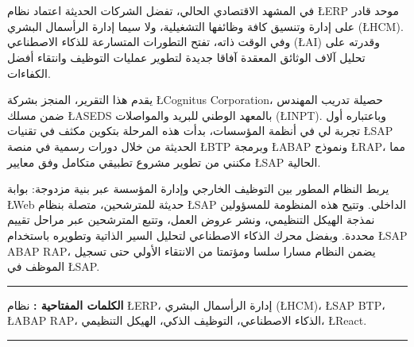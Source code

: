 \chapter*{}

\begin{RLtext}
\noindent
في المشهد الاقتصادي الحالي، تفضل الشركات الحديثة اعتماد نظام \L{ERP} موحد قادر على إدارة وتنسيق كافة وظائفها التشغيلية، ولا سيما إدارة الرأسمال البشري (\L{HCM}). وفي الوقت ذاته، تفتح التطورات المتسارعة للذكاء الاصطناعي (\L{AI}) وقدرته على تحليل آلاف الوثائق المعقدة آفاقا جديدة لتطوير عمليات التوظيف وانتقاء أفضل الكفاءات.

\vspace{0.3cm}
يقدم هذا التقرير، المنجز بشركة \L{Cognitus Corporation}، حصيلة تدريب المهندس ضمن مسلك \L{ASEDS} بالمعهد الوطني للبريد والمواصلات (\L{INPT}). وباعتباره أول تجربة لي في أنظمة المؤسسات، بدأت هذه المرحلة بتكوين مكثف في تقنيات \L{SAP} الحديثة من خلال دورات رسمية في منصة \L{BTP} وبرمجة \L{ABAP} ونموذج \L{RAP}، مما مكنني من تطوير مشروع تطبيقي متكامل وفق معايير \L{SAP} الحالية.

\vspace{0.3cm}
يربط النظام المطور بين التوظيف الخارجي وإدارة المؤسسة عبر بنية مزدوجة: بوابة \L{Web} حديثة للمترشحين، متصلة بنظام \L{SAP} الداخلي. وتتيح هذه المنظومة للمسؤولين نمذجة الهيكل التنظيمي، ونشر عروض العمل، وتتبع المترشحين عبر مراحل تقييم محددة. وبفضل محرك الذكاء الاصطناعي لتحليل السير الذاتية وتطويره باستخدام \L{SAP ABAP RAP}، يضمن النظام مسارا سلسا ومؤتمتا من الانتقاء الأولي حتى تسجيل الموظف في \L{SAP}.
\end{RLtext}

\noindent\rule[2pt]{\textwidth}{0.5pt}

\begin{RLtext} 
{\textbf{الكلمات المفتاحية :}}
نظام \L{ERP}، إدارة الرأسمال البشري (\L{HCM})، \L{SAP BTP}، \L{ABAP RAP}، الذكاء الاصطناعي، التوظيف الذكي، الهيكل التنظيمي، \L{React}.
\\
\end{RLtext}

\noindent\rule[2pt]{\textwidth}{0.5pt}